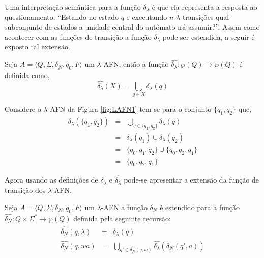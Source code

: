 Uma interpretação semântica para a função $\delta_\lambda$ é que ela representa a resposta ao questionamento: ``Estando no estado $q$ e executando $n$ $\lambda$-transições qual subconjunto de estados a unidade central do autômato irá assumir?''. Assim como acontecer com as funções de transição a função $\delta_\lambda$ pode ser estendida, a seguir é exposto tal extensão.

\begin{definition}\label{def:L-Fecho}
	Seja $A = \langle Q, \Sigma, \underline{\delta_N}, q_0, F\rangle$ um $\lambda$-AFN, então a função $\widehat{\delta_\lambda}: \wp(Q) \rightarrow \wp(Q)$ é definida como,
	\begin{equation}
		\widehat{\delta_\lambda}(X) = \bigcup_{q \in X} \delta_\lambda(q)
	\end{equation}
\end{definition} 

\begin{example}
	Considere o $\lambda$-AFN da Figura \ref{fig:LAFN1} tem-se para o conjunto $\{q_1, q_2\}$ que,
	\begin{eqnarray*}
		\widehat{\delta_\lambda}(\{q_1, q_2\}) & = & \bigcup_{q \in \{q_1, q_2\}} \delta_\lambda(q)\\
		& = & \delta_\lambda(q_1) \cup \delta_\lambda(q_2)\\
		& = & \{q_0, q_1, q_2\} \cup \{q_0, q_2, q_1\}\\
		& = & \{q_0, q_2, q_1\}
	\end{eqnarray*}
\end{example}

Agora usando as definições de $\delta_\lambda$ e $\widehat{\delta_\lambda}$ pode-se apresentar a extensão da função de transição dos $\lambda$-AFN.

\begin{definition}\label{def:FuncaoLDeltaNDEstendida}
	Seja $A = \langle Q, \Sigma, \underline{\delta_N}, q_0, F\rangle$  um $\lambda$-AFN a função $\underline{\delta_N}$ é estendido para a função $\widehat{\underline{\delta_N}}: Q \times \Sigma^* \rightarrow \wp(Q)$ definida pela seguinte recursão:
	\begin{eqnarray}\label{eq:FuncaoLDeltaNDEstendida}
		\widehat{\underline{\delta_N}}(q, \lambda)& = &  \delta_\lambda(q)\\
		\widehat{\underline{\delta_N}}(q, wa) & = & \bigcup_{q' \in \widehat{\underline{\delta_N}}(q, w)} \widehat{\delta_\lambda}(\underline{\delta_N}(q', a))
	\end{eqnarray}
\end{definition}

